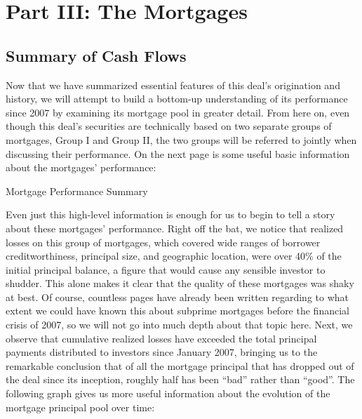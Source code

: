 \documentclass[12pt]{article}
\begin{document}
\section*{Part III: The Mortgages}
\subsection*{Summary of Cash Flows}

Now that we have summarized essential features of this deal’s origination and history, we will attempt to build a bottom-up understanding of its performance since 2007 by examining its mortgage pool in greater detail. From here on, even though this deal’s securities are technically based on two separate groups of mortgages, Group I and Group II, the two groups will be referred to jointly when discussing their performance. On the next page is some useful basic information about the mortgages’ performance:

\begin{table}[h]
	\centering
	
	\caption{Mortgage Performance Summary}
	\label{tab:table_deal_summary}
\end{table}

Even just this high-level information is enough for us to begin to tell a story about these mortgages’ performance. Right off the bat, we notice that realized losses on this group of mortgages, which covered wide ranges of borrower creditworthiness, principal size, and geographic location, were over 40\% of the initial principal balance, a figure that would cause any sensible investor to shudder. This alone makes it clear that the quality of these mortgages was shaky at best. Of course, countless pages have already been written regarding to what extent we could have known this about subprime mortgages before the financial crisis of 2007, so we will not go into much depth about that topic here. Next, we observe that cumulative realized losses have exceeded the total principal payments distributed to investors since January 2007, bringing us to the remarkable conclusion that of all the mortgage principal that has dropped out of the deal since its inception, roughly half has been “bad” rather than “good”. The following graph gives us more useful information about the evolution of the mortgage principal pool over time:
\end{document}
